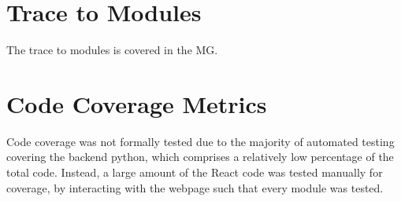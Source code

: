 \documentclass[12pt, titlepage]{article}
\begin{document}
\newpage 

\section{Trace to Modules}	
The trace to modules is covered in the MG.


\section{Code Coverage Metrics}
Code coverage was not formally tested due to the majority of automated testing covering the
backend python, which comprises a relatively low percentage of the total code.
Instead, a large amount of the React code was tested manually for coverage, by interacting 
with the webpage such that every module was tested.




\end{document}
